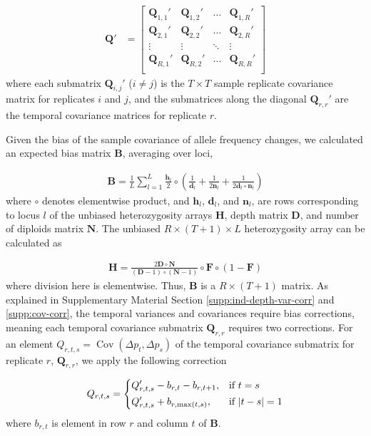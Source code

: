 \documentclass[11pt]{article}
\DeclareMathOperator{\cov}{Cov}
\begin{document}
\begin{align}
	\mathbf{Q}' &= 
  \begin{bmatrix} 
		\mathbf{Q}_{1,1}' & \mathbf{Q}_{1, 2}' & \ldots & \mathbf{Q}_{1, R}' \\ 
		\mathbf{Q}_{2,1}' & \mathbf{Q}_{2, 2}' & \ldots & \mathbf{Q}_{2, R}' \\ 
		\vdots & \vdots & \ddots & \vdots \\
		\mathbf{Q}_{R,1}' & \mathbf{Q}_{R, 2}' & \ldots & \mathbf{Q}_{R, R}' \\ 
  \end{bmatrix} 
\end{align}
%
where each submatrix $\mathbf{Q}_{i,j}'$ ($i \ne j$) is the $T \times T$ sample
replicate covariance matrix for replicates $i$ and $j$, and the submatrices
along the diagonal $\mathbf{Q}_{r,r}'$ are the temporal covariance matrices for
replicate $r$.

Given the bias of the sample covariance of allele frequency changes, we
calculated an expected bias matrix $\mathbf{B}$, averaging over loci,

\begin{align}
  \mathbf{B} = \frac{1}{L} \sum_{l=1}^L \frac{\mathbf{h}_l}{2} \circ \left( \frac{1}{\mathbf{d}_l} + \frac{1}{2\mathbf{n}_l} + \frac{1}{2\mathbf{d}_l \circ \mathbf{n}_l} \right)
\end{align}
%
where $\circ$ denotes elementwise product, and $\mathbf{h}_l$, $\mathbf{d}_l$,
and $\mathbf{n}_l$, are rows corresponding to locus $l$ of the unbiased
heterozygosity arrays $\mathbf{H}$, depth matrix $\mathbf{D}$, and number of
diploids matrix $\mathbf{N}$. The unbiased $R \times (T+1) \times L$
heterozygosity array can be calculated as  

\begin{align}
  \mathbf{H} = \frac{2 \mathbf{D} \circ \mathbf{N} }{ (\mathbf{D}-1) \circ (\mathbf{N} -1)} \circ \mathbf{F} \circ (1-\mathbf{F})
\end{align}
%
where division here is elementwise. Thus, $\mathbf{B}$ is a $R \times (T+1)$
matrix. As explained in Supplementary Material Section
\ref{supp:ind-depth-var-corr} and \ref{supp:cov-corr}, the temporal variances
and covariances require bias corrections, meaning each temporal covariance
submatrix $\mathbf{Q}_{r,r}$ requires two corrections. For an element
$Q_{r,t,s} = \cov(\Delta p_t, \Delta p_s)$ of the temporal covariance submatrix
for replicate $r$, $\mathbf{Q}_{r,r}$, we apply the following correction

\begin{equation}
	Q_{r,t,s} =  
		\begin{dcases}
			Q_{r,t,s}' - b_{r,t} - b_{r,t+1}, & \text{if  } t = s \\
      Q_{r,t,s}' + b_{r,\max(t,s)}, & \text{if  } |t - s| = 1 \\
		\end{dcases}
\end{equation}
%
where $b_{r,t}$ is element in row $r$ and column $t$ of $\mathbf{B}$.
\end{document}
